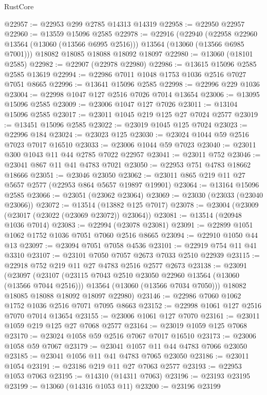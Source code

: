 \begin{lexlean}{RustCore}
\begin{coremodule}
@22957 := @22953 @299 @2785 @14313 @14319
@22958 := @22950 @22957
@22960 := @13559 @15096 @2585
@22978 := @22916
    (@22940
      (@22958 @22960 @13564 (@13060 (@13566 @6995 @2516)))
      @13564
      (@13060 (@13566 @6985 @7001)))
    @18082
    @18085
    @18088
    @18092
    @18097
@22980 := @13060 (@18101 @2585)
@22982 := @22907 (@22978 @22980)
@22986 := @13615 @15096 @2585 @2585 @13619
@22994 := @22986 @7011 @1048 @1753 @1036 @2516 @7027 @7051 @8665
@22996 := @13641 @15096 @2585
@22998 := @22996 @229 @1036
@23004 := @22998 @1047 @127 @2516 @7026 @7014 @13654
@23006 := @13095 @15096 @2585
@23009 := @23006 @1047 @127 @7026
@23011 := @13104 @15096 @2585
@23017 := @23011 @1045 @219 @125 @27 @7024 @2577
@23019 := @13451 @15096 @2585
@23022 := @23019 @1045 @125 @7024
@23023 := @22996 @184
@23024 := @23023 @125
@23030 := @23024 @1044 @59 @2516 @7023 @7017 @16510
@23033 := @23006 @1044 @59 @7023
@23040 := @23011 @300 @1043 @11 @44 @2785 @7022 @22957
@23041 := @23011 @752
@23046 := @23041 @867 @11 @41 @4783 @7021
@23050 := @22953 @751 @4783 @18662 @18666
@23051 := @23046 @23050
@23062 := @23011 @865 @219 @11 @27 @5657 @2577 (@22953 @864 @5657 @19897 @19901)
@23064 := @13164 @15096 @2585
@23066 := @23051 (@23062 @23064)
@23069 := @23030 (@23033 (@23040 @23066))
@23072 := @13514 (@13882 @125 @7017)
@23078 := @23004 (@23009 (@23017 (@23022 (@23069 @23072)) @23064))
@23081 := @13514 (@20948 @1036 @7014)
@23083 := @22994 (@23078 @23081)
@23091 := @22899 @1051 @1062 @1752 @1036 @7051 @7060 @2516 @8665
@23094 := @22910 @1050 @44 @13
@23097 := @23094 @7051 @7058 @4536
@23101 := @22919 @754 @11 @41 @3310
@23107 := @23101 @7050 @7057 @2673 @7033 @2510 @22939
@23115 := @22918 @752 @219 @11 @27 @4783 @2516 @2577 @2673
@23138 := @23091
    (@23097
      (@23107
        (@23115 @7043 @2510 @23050 @22960 @13564 (@13060 (@13566 @7044 @2516)))
        @13564
        (@13060 (@13566 @7034 @7050)))
      @18082
      @18085
      @18088
      @18092
      @18097
      @22980)
@23146 := @22986 @7060 @1062 @1752 @1036 @2516 @7071 @7095 @8663
@23152 := @22998 @1061 @127 @2516 @7070 @7014 @13654
@23155 := @23006 @1061 @127 @7070
@23161 := @23011 @1059 @219 @125 @27 @7068 @2577
@23164 := @23019 @1059 @125 @7068
@23170 := @23024 @1058 @59 @2516 @7067 @7017 @16510
@23173 := @23006 @1058 @59 @7067
@23179 := @23041 @1057 @11 @44 @4783 @7066 @23050
@23185 := @23041 @1056 @11 @41 @4783 @7065 @23050
@23186 := @23011 @1054
@23191 := @23186 @219 @11 @27 @7063 @2577
@23193 := @22953 @1053 @7063
@23195 := @14310 (@14311 @7063)
@23196 := @23193 @23195
@23199 := @13060 (@14316 @1053 @11)
@23200 := @23196 @23199

\end{coremodule}
\end{lexlean}
